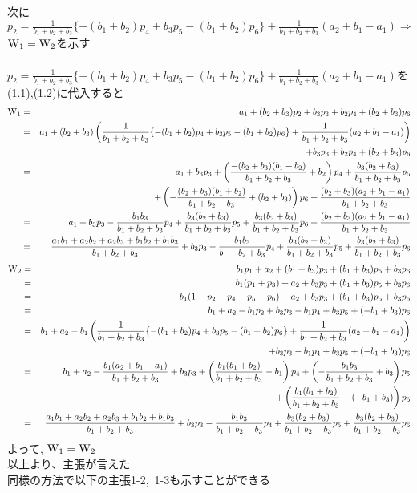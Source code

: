 \documentclass[11pt]{jarticle} %
\begin{document}
\vspace{5mm}
次に\\
$p_2=\frac{1}{b_1+b_2+b_3}\{-(b_1+b_2)p_4+b_3p_5-(b_1+b_2)p_6\}+\frac{1}{b_1+b_2+b_3}(a_2+b_1-a_1)\Rightarrow $
${\rm W_{1}}={\rm W_{2}}$を示す\\
\vspace{3mm}\\
$p_2=\frac{1}{b_1+b_2+b_3}\{-(b_1+b_2)p_4+b_3p_5-(b_1+b_2)p_6\}+\frac{1}{b_1+b_2+b_3}(a_2+b_1-a_1)$を(1.1),(1.2)に代入すると
\begin{eqnarray*}
{\rm W_{1}}&=&a_1+(b_2+b_3)p_2+b_3p_3+b_2p_4+(b_2+b_3)p_6 \\
&=&a_1+(b_2+b_3) \left(\frac{1}{b_1+b_2+b_3}\{-(b_1+b_2)p_4+b_3p_5-(b_1+b_2)p_6\}+\frac{1}{b_1+b_2+b_3}(a_2+b_1-a_1)\right) \\
&&\hspace{265pt}+b_3p_3+b_2p_4+(b_2+b_3)p_6 \\
&=& a_1+ b_3p_3+\left(\frac{-(b_2+b_3)(b_1+b_2)}{b_1+b_2+b_3}+b_2 \right) p_4 +\frac{b_3(b_2+b_3)}{b_1+b_2+b_3}p_5 \\
&&\hspace{120pt}+ \left(-\frac{(b_2+b_3)(b_1+b_2)}{b_1+b_2+b_3}+(b_2+b_3) \right)p_6+\frac{(b_2+b_3)(a_2+b_1-a_1)}{b_1+b_2+b_3}\\
&=&a_1+b_3p_3-\frac{b_1b_3}{b_1+b_2+b_3}p_4+\frac{b_3(b_2+b_3)}{b_1+b_2+b_3}p_5+
\frac{b_3(b_2+b_3)}{b_1+b_2+b_3}p_6+\frac{(b_2+b_3)(a_2+b_1-a_1)}{b_1+b_2+b_3} \\
&=&\frac{a_1b_1+a_2b_2+a_2b_3+b_1b_2+b_1b_3}{b_1+b_2+b_3}+b_3p_3-\frac{b_1b_3}{b_1+b_2+b_3}p_4+\frac{b_3(b_2+b_3)}{b_1+b_2+b_3}p_5+
\frac{b_3(b_2+b_3)}{b_1+b_2+b_3}p_6
\end{eqnarray*}
\begin{eqnarray*}
{\rm W_{2}}&=&b_1p_1+a_2+(b_1+b_3)p_3+(b_1+b_3)p_5+b_3p_6\\
&=&b_1(p_1+p_3)+a_2+b_3p_3+(b_1+b_3)p_5+b_3p_6 \\
&=&b_1(1-p_2-p_4-p_5-p_6)+a_2+b_3p_3+(b_1+b_3)p_5+b_3p_6\\
&=&b_1+a_2-b_1p_2+b_3p_3-b_1p_4+b_3p_5+(-b_1+b_3)p_6\\
&=&b_1+a_2-b_1\left(\frac{1}{b_1+b_2+b_3}\{-(b_1+b_2)p_4+b_3p_5-(b_1+b_2)p_6\}+\frac{1}{b_1+b_2+b_3}(a_2+b_1-a_1)\right)\\
&&\hspace{230pt}+b_3p_3-b_1p_4+b_3p_5+(-b_1+b_3)p_6\\
&=&b_1+a_2-\frac{b_1(a_2+b_1-a_1)}{b_1+b_2+b_3}+b_3p_3+\left(\frac{b_1(b_1+b_2)}{b_1+b_2+b_3}-b_1 \right) p_4+\left(-\frac{b_1b_3}{b_1+b_2+b_3}+b_3\right)p_5\\
&&\hspace{230pt}+\left(\frac{b_1(b_1+b_2)}{b_1+b_2+b_3}+(-b_1+b_3) \right) p_6\\
&=&\frac{a_1b_1+a_2b_2+a_2b_3+b_1b_2+b_1b_3}{b_1+b_2+b_3}+b_3p_3-\frac{b_1b_3}{b_1+b_2+b_3}p_4+\frac{b_3(b_2+b_3)}{b_1+b_2+b_3}p_5+\frac{b_3(b_2+b_3)}{b_1+b_2+b_3}p_6
\end{eqnarray*}
よって, ${\rm W_{1}}={\rm W_{2}}$\\
以上より、主張が言えた\\
同様の方法で以下の主張1-2,~1-3も示すことができる\\
\end{document}

